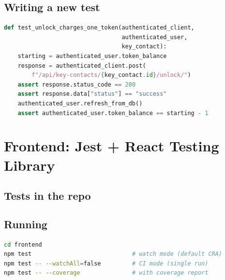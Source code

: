 \documentclass[11pt,a4paper,oneside]{book}
\DeclareRobustCommand{\fileref}[1]{\texorpdfstring{\colorbox{filerefbg}{\strut\ttfamily\small\detokenize{#1}}}{#1}}
\DeclareRobustCommand{\inlinecode}[1]{\texorpdfstring{\colorbox{codebg}{\strut\ttfamily\small\detokenize{#1}}}{#1}}
\begin{document}
\subsection{Writing a new test}

\begin{lstlisting}[language=Python,caption={Sample test using the fixtures}]
def test_unlock_charges_one_token(authenticated_client,
                                  authenticated_user,
                                  key_contact):
    starting = authenticated_user.token_balance
    response = authenticated_client.post(
        f"/api/key-contacts/{key_contact.id}/unlock/")
    assert response.status_code == 200
    assert response.data["status"] == "success"
    authenticated_user.refresh_from_db()
    assert authenticated_user.token_balance == starting - 1
\end{lstlisting}

\section{Frontend: Jest + React Testing Library}

\subsection{Tests in the repo}


\subsection{Running}

\begin{lstlisting}[language=Bash,numbers=none]
cd frontend
npm test                             # watch mode (default CRA)
npm test -- --watchAll=false         # CI mode (single run)
npm test -- --coverage               # with coverage report
\end{lstlisting}
\end{document}
